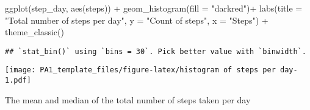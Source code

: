 \documentclass[
]{article}
\newenvironment{Shaded}{\begin{snugshade}}{\end{snugshade}}
\newcommand{\AttributeTok}[1]{\textcolor[rgb]{0.77,0.63,0.00}{#1}}
\newcommand{\ConstantTok}[1]{\textcolor[rgb]{0.00,0.00,0.00}{#1}}
\newcommand{\DecValTok}[1]{\textcolor[rgb]{0.00,0.00,0.81}{#1}}
\newcommand{\FunctionTok}[1]{\textcolor[rgb]{0.00,0.00,0.00}{#1}}
\newcommand{\NormalTok}[1]{#1}
\newcommand{\OtherTok}[1]{\textcolor[rgb]{0.56,0.35,0.01}{#1}}
\newcommand{\SpecialCharTok}[1]{\textcolor[rgb]{0.00,0.00,0.00}{#1}}
\newcommand{\StringTok}[1]{\textcolor[rgb]{0.31,0.60,0.02}{#1}}
\begin{document}
\begin{Shaded}
\begin{Highlighting}[]
  \FunctionTok{ggplot}\NormalTok{(step\_day, }\FunctionTok{aes}\NormalTok{(steps)) }\SpecialCharTok{+}
     \FunctionTok{geom\_histogram}\NormalTok{(}\AttributeTok{fill =} \StringTok{"darkred"}\NormalTok{)}\SpecialCharTok{+}
     \FunctionTok{labs}\NormalTok{(}\AttributeTok{title =} \StringTok{"Total number of steps per day"}\NormalTok{,}
              \AttributeTok{y =} \StringTok{"Count of steps"}\NormalTok{,}
              \AttributeTok{x =} \StringTok{"Steps"}\NormalTok{) }\SpecialCharTok{+}
     \FunctionTok{theme\_classic}\NormalTok{()}
\end{Highlighting}
\end{Shaded}

\begin{verbatim}
## `stat_bin()` using `bins = 30`. Pick better value with `binwidth`.
\end{verbatim}

\texttt{[image: PA1\_template\_files/figure-latex/histogram of steps per day-1.pdf]}

The mean and median of the total number of steps taken per day

\begin{Shaded}
\end{Shaded}
\end{document}

